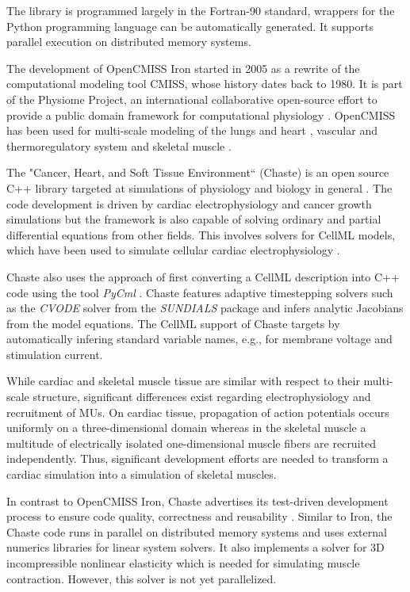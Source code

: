 The library is programmed largely in the Fortran-90 standard, wrappers for the Python programming language can be automatically generated. It supports parallel execution on distributed memory systems.

The development of OpenCMISS Iron started in 2005 as a rewrite of the computational modeling tool CMISS, whose history dates back to 1980. It is part of the Physiome Project, an international collaborative open-source effort to provide a public domain framework for computational physiology \cite{Hunter2004}.
OpenCMISS has been used for multi-scale modeling of the lungs and heart \cite{smith2004multiscale}, vascular and thermoregulatory system \cite{ladd2016open,ghadam2020modeling} and skeletal muscle \cite{Heidlauf2013}. 

The "Cancer, Heart, and Soft Tissue Environment`` (Chaste) is an open source C++ library targeted at simulations of physiology and biology in general \cite{Chaste2013}. The code development is driven by cardiac electrophysiology and cancer growth simulations but the framework is also capable of solving  ordinary and partial differential equations from other fields. This involves solvers for CellML models, which have been used to simulate cellular cardiac electrophysiology \cite{ChasteCellML2015}.

Chaste \cite{ChasteCellML2015} also uses the approach of first converting a CellML description into C++ code using the tool \emph{PyCml} \cite{Cooper2006}. Chaste features adaptive timestepping solvers such as the \emph{CVODE} solver from the \emph{SUNDIALS} package \cite{cohen1996cvode} and infers analytic Jacobians from the model equations. The CellML support of Chaste targets  by automatically infering standard variable names, e.g., for membrane voltage and stimulation current.

While cardiac and skeletal muscle tissue are similar with respect to their multi-scale structure, significant differences exist regarding electrophysiology and recruitment of MUs. On cardiac tissue, propagation of action potentials occurs uniformly on a three-dimensional domain whereas in the skeletal muscle a multitude of electrically isolated one-dimensional muscle fibers are recruited independently.
Thus, significant development efforts are needed to transform a cardiac simulation into a simulation of skeletal muscles.

In contrast to OpenCMISS Iron, Chaste advertises its test-driven development process to ensure code quality, correctness and reusability \cite{Chaste2009}. Similar to Iron, the Chaste code runs in parallel on distributed memory systems and uses external numerics libraries for linear system solvers.
It also implements a solver for 3D incompressible nonlinear elasticity which is needed for simulating muscle contraction. However, this solver is not yet parallelized.

